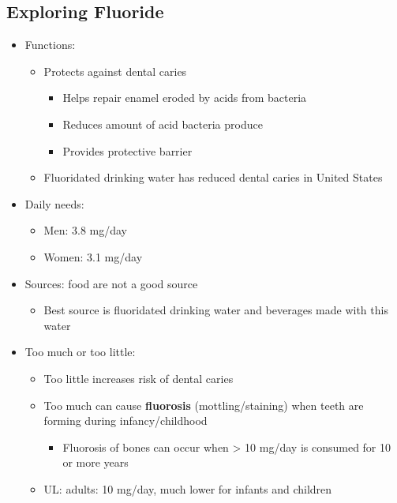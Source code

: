 \documentclass[12pt]{article}
\begin{document}
        \subsection{Exploring Fluoride}
            \begin{itemize}
                \item Functions:
                    \begin{itemize}
                        \item Protects against dental caries
                            \begin{itemize}
                                \item Helps repair enamel eroded by acids from bacteria
                                \item Reduces amount of acid bacteria produce
                                \item Provides protective barrier
                            \end{itemize}
                        \item Fluoridated drinking water has reduced dental caries in United States
                    \end{itemize}
                \item Daily needs:
                    \begin{itemize}
                        \item Men: 3.8 mg/day
                        \item Women: 3.1 mg/day
                    \end{itemize}
                \item Sources: food are not a good source
                    \begin{itemize}
                        \item Best source is fluoridated drinking water and beverages made with this water
                    \end{itemize}
                \item Too much or too little:
                    \begin{itemize}
                        \item Too little increases risk of dental caries
                        \item Too much can cause \textbf{fluorosis} (mottling/staining) when teeth are forming during infancy/childhood
                            \begin{itemize}
                                \item Fluorosis of bones can occur when > 10 mg/day is consumed for 10 or more years
                            \end{itemize}
                        \item UL: adults: 10 mg/day, much lower for infants and children
                    \end{itemize}
            \end{itemize}
\end{document}

